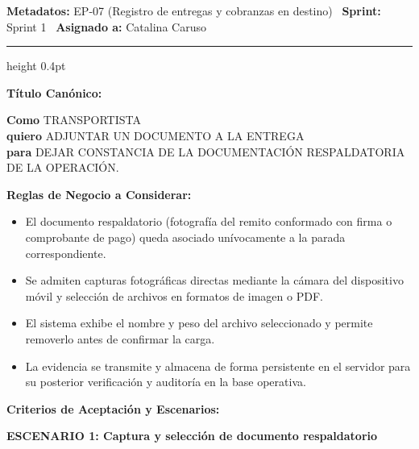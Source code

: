 \documentclass[a4paper,9pt]{article}
\begin{document}
\begin{tcolorbox}[hucard, title={\textbf{HU-55: ADJUNTAR UN DOCUMENTO} \hfill \scriptsize \colorbox{slatestatus}{\textbf{\ Done\ }} \quad \colorbox{white}{\textcolor{primarydark}{\textbf{\ 2 pts\ }}}}]
\vspace{-1pt}
\noindent\textbf{\footnotesize Metadatos:} EP-07 (Registro de entregas y cobranzas en destino) \textbar\ \textbf{Sprint:} Sprint 1 \textbar\ \textbf{Asignado a:} Catalina Caruso\par\vspace{2pt}
\hrule height 0.4pt\par\vspace{3pt}
\noindent\textbf{\footnotesize Título Canónico:}\par\vspace{1pt}
{\small \textbf{Como} TRANSPORTISTA \\ \textbf{quiero} ADJUNTAR UN DOCUMENTO A LA ENTREGA \\ \textbf{para} DEJAR CONSTANCIA DE LA DOCUMENTACIÓN RESPALDATORIA DE LA OPERACIÓN.}\par\vspace{3pt}
\noindent\textbf{\footnotesize Reglas de Negocio a Considerar:}\par\vspace{1pt}
{\footnotesize
\begin{itemize}[leftmargin=12pt, nosep, itemsep=1.5pt, topsep=1pt]
\item El documento respaldatorio (fotografía del remito conformado con firma o comprobante de pago) queda asociado unívocamente a la parada correspondiente.
\item Se admiten capturas fotográficas directas mediante la cámara del dispositivo móvil y selección de archivos en formatos de imagen o PDF.
\item El sistema exhibe el nombre y peso del archivo seleccionado y permite removerlo antes de confirmar la carga.
\item La evidencia se transmite y almacena de forma persistente en el servidor para su posterior verificación y auditoría en la base operativa.
\end{itemize}
}\par\vspace{3pt}
\noindent\textbf{\footnotesize Criterios de Aceptación y Escenarios:}\par\vspace{2pt}
{\footnotesize
\noindent\textbf{\textcolor{secondarydark}{ESCENARIO 1:  Captura y selección de documento respaldatorio}}\par\vspace{1pt}
}
\end{tcolorbox}
\end{document}

